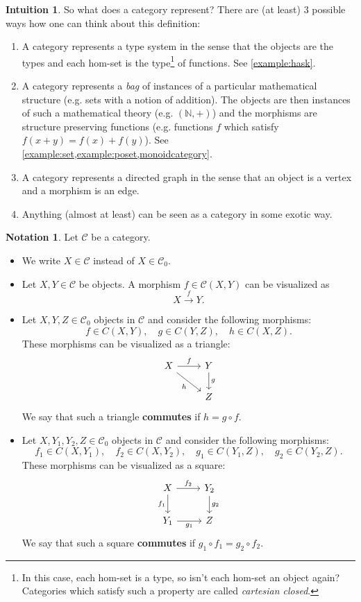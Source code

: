 \documentclass[a4paper,11pt, oneside,titlepage=false]{scrbook}
\theoremstyle{plain}
\theoremstyle{definition}
\newtheorem{intu}[thm]{Intuition}
\newtheorem{nota}[thm]{Notation}
\newcommand{\Cat}[1]{\mathcal{#1}}
\newcommand{\CC}{\Cat{C}}
\newcommand{\Ob}[1]{{#1}_0}
\newcommand{\CHom}[3]{{#1}(#2,#3)}
\newcommand{\co}[2]{\ensuremath{#2 \circ #1}}
\begin{document}
\begin{intu} So what does a category represent? There are (at least) $3$ possible ways how one can think about this definition:
\begin{enumerate}
\item A category represents a type system in the sense that the objects are the types and each hom-set is the type\footnote{In this case, each hom-set is a type, so isn't each hom-set an object again? Categories which satisfy such a property are called \textit{cartesian closed}.} of functions. See \cref{example:hask}.
\item A category represents a \textit{bag} of instances of a particular mathematical structure (e.g. sets with a notion of addition). The objects are then instances of such a mathematical theory (e.g. $(\mathbb{N},+)$) and the morphisms are structure preserving functions (e.g. functions $f$ which satisfy $f(x+y) = f(x) + f(y)$). See \cref{example:set,example:poset,monoidcategory}.
\item A category represents a directed graph in the sense that an object is a vertex and a morphism is an edge.
\item Anything (almost at least) can be seen as a category in some exotic way. 
\end{enumerate}
\end{intu}

\begin{nota} Let $\CC$ be a category.
\begin{itemize}
\item We write $X\in\CC$ instead of $X\in \Ob{\CC}$. 
\item Let $X,Y\in \CC$ be objects. A morphism $f\in\CHom{\CC}{X}{Y}$ can be visualized as \[ X \xrightarrow{f} Y. \]
\item Let $X,Y, Z \in \Ob{\CC}$ objects in $\CC$ and consider the following morphisms:
\[
f\in\CHom{C}{X}{Y}, \quad g\in\CHom{C}{Y}{Z}, \quad h\in\CHom{C}{X}{Z}.
\]
These morphisms can be visualized as a triangle:
\[
\begin{tikzcd}
X \arrow[r, "f"] \arrow[dr,swap, "h"] & Y \arrow[d, "g"] \\
& Z
\end{tikzcd}
\]
We say that such a triangle \textbf{commutes} if $h = \co{f}{g}$.
\item Let $X,Y_1,Y_2, Z \in \Ob{\CC}$ objects in $\CC$ and consider the following morphisms:
\[
f_1\in\CHom{C}{X}{Y_1}, \quad f_2\in\CHom{C}{X}{Y_2}, \quad g_1\in\CHom{C}{Y_1}{Z}, \quad g_2\in\CHom{C}{Y_2}{Z}.
\]
These morphisms can be visualized as a square:
\[
\begin{tikzcd}
X \arrow[r, "f_2"] \arrow[d,swap, "f_1"] & Y_2 \arrow[d, "g_2"] \\
Y_1 \arrow[r, swap, "g_1"] & Z 
\end{tikzcd}
\]
We say that such a square \textbf{commutes} if $\co{f_1}{g_1} = \co{f_2}{g_2}$.
\end{itemize}
\end{nota}
\end{document}

